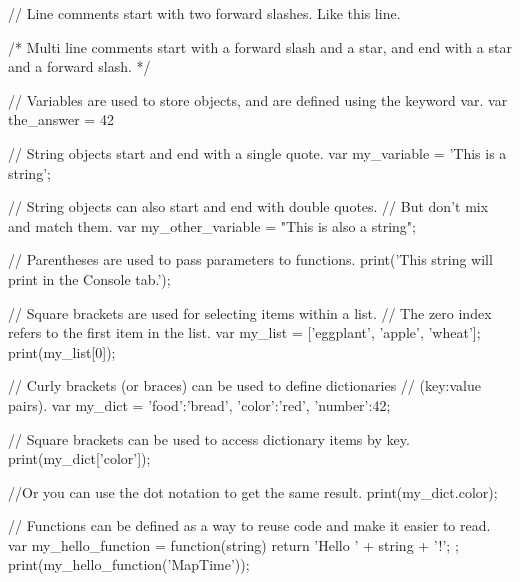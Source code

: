 // Line comments start with two forward slashes. Like this line.

/* Multi line comments start with a forward slash and a star,
and end with a star and a forward slash. */

// Variables are used to store objects, and are defined using the keyword var.
var the_answer = 42

// String objects start and end with a single quote.
var my_variable = 'This is a string';

// String objects can also start and end with double quotes.
// But don't mix and match them.
var my_other_variable = "This is also a string";



// Parentheses are used to pass parameters to functions.
print('This string will print in the Console tab.');


// Square brackets are used for selecting items within a list.  
// The zero index refers to the first item in the list.
var my_list = ['eggplant', 'apple', 'wheat'];
print(my_list[0]);

// Curly brackets (or braces) can be used to define dictionaries
// (key:value pairs).
var my_dict = {'food':'bread', 'color':'red', 'number':42};

// Square brackets can be used to access dictionary items by key.
print(my_dict['color']);

//Or you can use the dot notation to get the same result.
print(my_dict.color);

// Functions can be defined as a way to reuse code and make it easier to read.
var my_hello_function = function(string) {
  return 'Hello ' + string + '!';
};
print(my_hello_function('MapTime'));